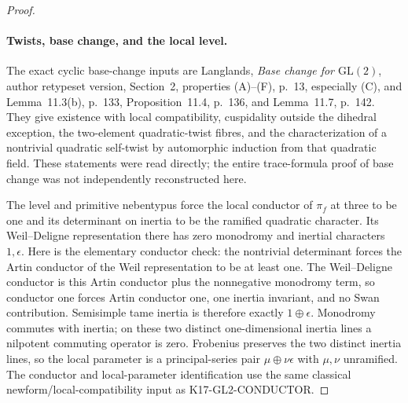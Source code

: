 \begin{proof}
\paragraph{Twists, base change, and the local level.}
The exact cyclic base-change inputs are Langlands,
\emph{Base change for $\mathrm{GL}(2)$}, author retypeset version,
Section~2, properties (A)--(F), p.~13, especially (C), and
Lemma~11.3(b), p.~133, Proposition~11.4, p.~136, and
Lemma~11.7, p.~142. They give existence with local compatibility,
cuspidality outside the dihedral exception, the two-element
quadratic-twist fibres, and the characterization of a nontrivial
quadratic self-twist by automorphic induction from that quadratic
field. These statements were read directly; the entire trace-formula
proof of base change was not independently reconstructed here.

The level and primitive nebentypus force the local conductor of
$\pi_f$ at three to be one and its determinant on inertia to be
the ramified quadratic character. Its Weil--Deligne representation
there has zero monodromy and inertial characters $1,\epsilon$.
Here is the elementary conductor check: the nontrivial determinant
forces the Artin conductor of the Weil representation to be at
least one. The Weil--Deligne conductor is this Artin conductor
plus the nonnegative monodromy term, so conductor one forces
Artin conductor one, one inertia invariant, and no Swan
contribution. Semisimple tame inertia is therefore exactly
$1\oplus\epsilon$. Monodromy commutes with inertia; on these
two distinct one-dimensional inertia lines a nilpotent commuting
operator is zero. Frobenius preserves the two distinct inertia lines,
so the local parameter is a principal-series pair
$\mu\oplus\nu\epsilon$ with $\mu,\nu$ unramified.
The conductor and local-parameter identification use the same
classical newform/local-compatibility input as K17-GL2-CONDUCTOR.


\end{proof}
